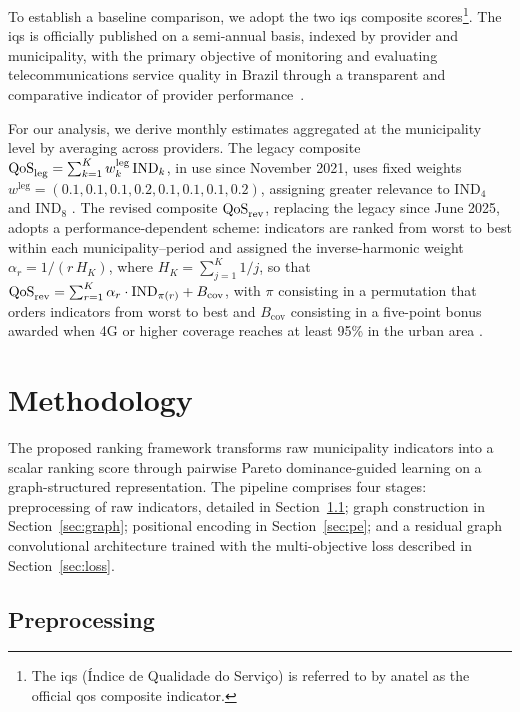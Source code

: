 \documentclass[english]{sbrt}
\begin{document}
To establish a baseline comparison, we adopt the two \gls{iqs} composite
scores\footnote{The \gls{iqs} (Índice de Qualidade do Serviço) is referred to by
\gls{anatel} as the official \gls{qos} composite indicator.}. The \gls{iqs} is
officially published on a semi-annual basis, indexed by provider and
municipality, with the primary objective of monitoring and evaluating
telecommunications service quality in Brazil through a transparent and
comparative indicator of provider
performance~\cite{anatel2025ri444,anatel2021ri71}.

For our analysis, we derive monthly estimates aggregated at the municipality
level by averaging across providers. The legacy composite $\mathrm{QoS}_\mathrm{leg} =
\sum_{k=1}^{K} w_k^{\mathrm{leg}}\,\mathrm{IND}_k$, in use since November 2021,
uses fixed weights $w^{\mathrm{leg}} = (0.1, 0.1, 0.1, 0.2, 0.1, 0.1, 0.1,
0.2)$, assigning greater relevance to $\mathrm{IND}_4$ and $\mathrm{IND}_8$
\cite{anatel2021ri71}. The revised composite $\mathrm{QoS}_\mathrm{rev}$, replacing the legacy
since June 2025, adopts a performance-dependent scheme: indicators are ranked
from worst to best within each municipality--period and assigned the
inverse-harmonic weight $\alpha_r = 1/(r\,H_K)$, where $H_K =
\sum_{j=1}^{K}1/j$, so that $\mathrm{QoS}_\mathrm{rev} = \sum_{r=1}^{K}
\alpha_r\cdot\mathrm{IND}_{\pi(r)} + B_{\mathrm{cov}}$, with $\pi$ consisting in
a permutation that orders indicators from worst to best and $B_{\mathrm{cov}}$
consisting in a five-point bonus awarded when 4G or higher coverage reaches at
least 95\% in the urban area \cite{anatel2025ri444}.

\section{Methodology} \label{sec:methodology}

The proposed ranking framework transforms raw municipality indicators into a
scalar ranking score through pairwise Pareto dominance-guided learning on a
graph-structured representation. The pipeline comprises four stages:
preprocessing of raw indicators, detailed in Section~\ref{sec:preproc}; graph
construction in Section~\ref{sec:graph}; positional encoding in
Section~\ref{sec:pe}; and a residual graph convolutional architecture trained
with the multi-objective loss described in Section~\ref{sec:loss}.

\subsection{Preprocessing} \label{sec:preproc}
\end{document}
